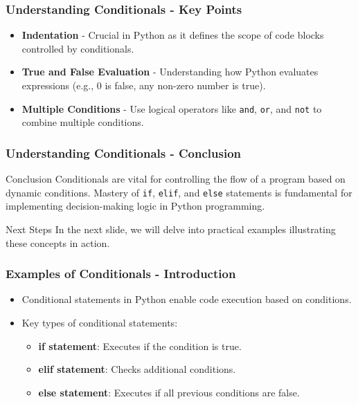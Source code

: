 \documentclass{beamer}
\begin{document}
\begin{frame}[fragile]
    \frametitle{Understanding Conditionals - Key Points}
    \begin{itemize}
        \item \textbf{Indentation} - Crucial in Python as it defines the scope of code blocks controlled by conditionals.
        \item \textbf{True and False Evaluation} - Understanding how Python evaluates expressions (e.g., 0 is false, any non-zero number is true).
        \item \textbf{Multiple Conditions} - Use logical operators like \texttt{and}, \texttt{or}, and \texttt{not} to combine multiple conditions.
    \end{itemize}
\end{frame}

\begin{frame}[fragile]
    \frametitle{Understanding Conditionals - Conclusion}
    \begin{block}{Conclusion}
        Conditionals are vital for controlling the flow of a program based on dynamic conditions. Mastery of \texttt{if}, \texttt{elif}, and \texttt{else} statements is fundamental for implementing decision-making logic in Python programming.
    \end{block}
    \begin{block}{Next Steps}
        In the next slide, we will delve into practical examples illustrating these concepts in action.
    \end{block}
\end{frame}

\begin{frame}[fragile]
    \frametitle{Examples of Conditionals - Introduction}
    \begin{itemize}
        \item Conditional statements in Python enable code execution based on conditions.
        \item Key types of conditional statements:
        \begin{itemize}
            \item \textbf{if statement}: Executes if the condition is true.
            \item \textbf{elif statement}: Checks additional conditions.
            \item \textbf{else statement}: Executes if all previous conditions are false.
        \end{itemize}
    \end{itemize}
\end{frame}
\end{document}
